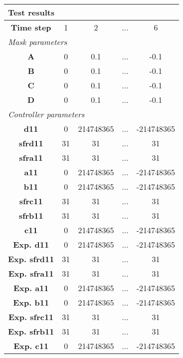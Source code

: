 \vspace{1em}
\begin{tabularx}{\textwidth}{|c|c|c|>{\centering\arraybackslash}X|c|}
\hline
\multicolumn{5}{|l|}{\cellcolor[gray]{0.8}\textbf{Test results}} \tabularnewline \hline
\textbf{Time step} & 1 & 2 & ... & 6 \tabularnewline \hline
\multicolumn{5}{|l|}{\cellcolor[gray]{0.9}\textit{Mask parameters}} \tabularnewline \hline
\textbf{A} & 0 & 0.1 & ... & -0.1 \tabularnewline \hline
\textbf{B} & 0 & 0.1 & ... & -0.1 \tabularnewline \hline
\textbf{C} & 0 & 0.1 & ... & -0.1 \tabularnewline \hline
\textbf{D} & 0 & 0.1 & ... & -0.1 \tabularnewline \hline
\multicolumn{5}{|l|}{\cellcolor[gray]{0.9}\textit{Controller parameters}} \tabularnewline \hline
\textbf{d11} & 0 & 214748365 & ... & -214748365 \tabularnewline \hline
\textbf{sfrd11} & 31 & 31 & ... & 31 \tabularnewline \hline
\textbf{sfra11} & 31 & 31 & ... & 31 \tabularnewline \hline
\textbf{a11} & 0 & 214748365 & ... & -214748365 \tabularnewline \hline
\textbf{b11} & 0 & 214748365 & ... & -214748365 \tabularnewline \hline
\textbf{sfrc11} & 31 & 31 & ... & 31 \tabularnewline \hline
\textbf{sfrb11} & 31 & 31 & ... & 31 \tabularnewline \hline
\textbf{c11} & 0 & 214748365 & ... & -214748365 \tabularnewline \hline
\textbf{Exp. d11} & 0 & 214748365 & ... & -214748365 \tabularnewline \hline
\textbf{Exp. sfrd11} & 31 & 31 & ... & 31 \tabularnewline \hline
\textbf{Exp. sfra11} & 31 & 31 & ... & 31 \tabularnewline \hline
\textbf{Exp. a11} & 0 & 214748365 & ... & -214748365 \tabularnewline \hline
\textbf{Exp. b11} & 0 & 214748365 & ... & -214748365 \tabularnewline \hline
\textbf{Exp. sfrc11} & 31 & 31 & ... & 31 \tabularnewline \hline
\textbf{Exp. sfrb11} & 31 & 31 & ... & 31 \tabularnewline \hline
\textbf{Exp. c11} & 0 & 214748365 & ... & -214748365 \tabularnewline \hline
\end{tabularx}
\vspace{1ex}
